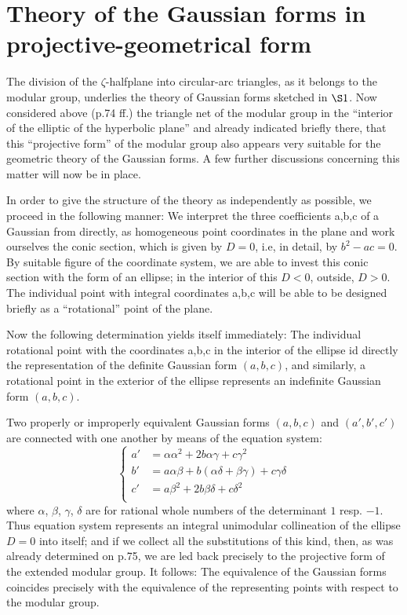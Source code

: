 \section{Theory of the Gaussian forms in projective-geometrical form}

The division of the $\zeta$-halfplane into circular-arc triangles, as it belongs to the modular group, underlies the theory of Gaussian forms sketched in $\S 1$. Now considered above (p.74 ff.) the triangle net of the modular group in the “interior of the elliptic of the hyperbolic plane” and already indicated briefly there, that this “projective form” of the modular group also appears very suitable for the geometric theory of the Gaussian forms. A few further discussions concerning this matter will now be in place.

In order to give the structure of the theory as independently as possible, we proceed in the following manner: We interpret the three coefficients a,b,c of a Gaussian from directly, as homogeneous point coordinates in the plane and work ourselves the conic section, which is given by $D=0$, i.e, in detail, by $b^2-ac=0$. By suitable figure of the coordinate system, we are able to invest this conic section with the form of an ellipse; in the interior of this $D<0$, outside, $D>0$. The individual point with integral coordinates a,b,c will be able to be designed briefly as a “rotational” point of the plane.

Now the following determination yields itself immediately: The individual rotational point with the coordinates a,b,c in the interior of the ellipse id directly the representation of the definite Gaussian form $(a,b,c)$, and similarly, a rotational point in the exterior of the ellipse represents an indefinite Gaussian form $(a,b,c)$.

Two properly or improperly equivalent Gaussian forms $(a,b,c)$ and $(a',b',c')$ are connected with one another by means of the equation system:
\begin{equation}
\left\{
\begin{split}
a'&=\alpha\alpha^2+2b\alpha\gamma+c\gamma^2\\
b'&=a\alpha\beta+b(\alpha\delta+\beta\gamma)+c\gamma\delta\\
c'&=a\beta^2+2b\beta\delta+c\delta^2\\
\end{split}\right.
\end{equation}
where $\alpha$, $\beta$, $\gamma$, $\delta$ are for rational whole numbers of the determinant $1$ resp. $-1$. Thus equation system represents an integral unimodular collineation of the ellipse $D=0$ into itself; and if we collect all the substitutions of this kind, then, as was already determined on p.75, we are led back precisely to the projective form of the extended modular group. It follows: The equivalence of the Gaussian forms coincides precisely with the equivalence of the representing points with respect to the modular group.

